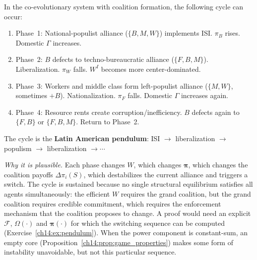 \documentclass[../structural_economics_book.tex]{subfiles}
\begin{document}
\begin{conjecture}\label{ch14:thm:cycling}
In the co-evolutionary system with coalition formation, the following cycle can occur:
\begin{enumerate}
\item Phase~1: National-populist alliance ($\{B, M, W\}$) implements ISI. $\pi_B$ rises. Domestic $\Gamma$ increases.
\item Phase~2: $B$ defects to techno-bureaucratic alliance ($\{F, B, M\}$). Liberalization. $\pi_W$ falls. $W^I$ becomes more center-dominated.
\item Phase~3: Workers and middle class form left-populist alliance ($\{M, W\}$, sometimes $+B$). Nationalization. $\pi_F$ falls. Domestic $\Gamma$ increases again.
\item Phase~4: Resource rents create corruption/inefficiency. $B$ defects again to $\{F, B\}$ or $\{F, B, M\}$. Return to Phase~2.
\end{enumerate}
The cycle is the \textbf{Latin American pendulum}: ISI $\to$ liberalization $\to$ populism $\to$ liberalization $\to \cdots$
\end{conjecture}

\noindent\textit{Why it is plausible.} Each phase changes $W$, which changes $\boldsymbol{\pi}$, which changes the coalition payoffs $\Delta\pi_i(S)$, which destabilizes the current alliance and triggers a switch. The cycle is sustained because no single structural equilibrium satisfies all agents simultaneously: the efficient $W$ requires the grand coalition, but the grand coalition requires credible commitment, which requires the enforcement mechanism that the coalition proposes to change. A proof would need an explicit $\mathcal{F}$, $\Omega(\cdot)$ and $\boldsymbol{\pi}(\cdot)$ for which the switching sequence can be computed (Exercise~\ref{ch14:ex:pendulum}). When the power component is constant-sum, an empty core (Proposition~\ref{ch14:prop:game_properties}) makes some form of instability unavoidable, but not this particular sequence.
\end{document}

